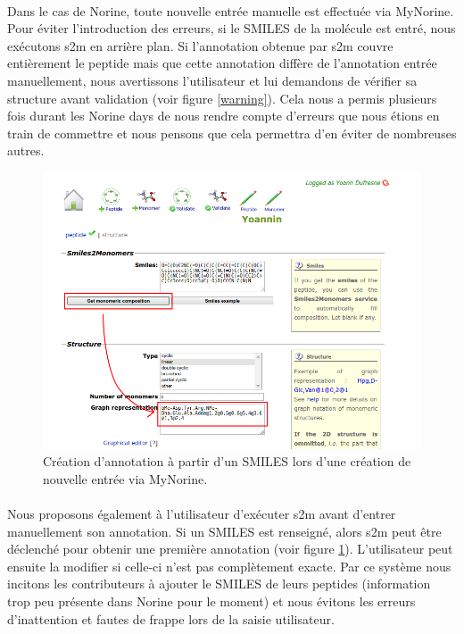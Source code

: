 \documentclass[12pt,french,twoside]{report}
\begin{document}
\paragraph{}Dans le cas de Norine, toute nouvelle entrée manuelle est effectuée via MyNorine.
Pour éviter l'introduction des erreurs, si le SMILES de la molécule est entré, nous exécutons s2m en arrière plan.
Si l'annotation obtenue par s2m couvre entièrement le peptide mais que cette annotation diffère de l'annotation entrée manuellement, nous avertissons l'utilisateur et lui demandons de vérifier sa structure avant validation (voir figure \ref{warning}).
Cela nous a permis plusieurs fois durant les Norine days de nous rendre compte d'erreurs que nous étions en train de commettre et nous pensons que cela permettra d'en éviter de nombreuses autres.

\begin{figure}[h!]
  \begin{center}
    \includegraphics[width=450px]{Figures/contributions/s2m_automatic.png}
    \caption{\label{s2m_automatic}Création d'annotation à partir d'un SMILES lors d'une création de nouvelle entrée via MyNorine.}
  \end{center}
\end{figure}

\paragraph{}Nous proposons également à l'utilisateur d'exécuter s2m avant d'entrer manuellement son annotation.
Si un SMILES est renseigné, alors s2m peut être déclenché pour obtenir une première annotation (voir figure \ref{s2m_automatic}).
L'utilisateur peut ensuite la modifier si celle-ci n'est pas complètement exacte.
Par ce système nous incitons les contributeurs à ajouter le SMILES de leurs peptides (information trop peu présente dans Norine pour le moment) et nous évitons les erreurs d'inattention et fautes de frappe lors de la saisie utilisateur.
\end{document}
